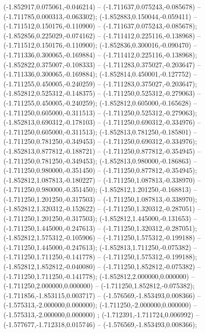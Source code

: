  (-1.852917,0.075061,-0.046214) -- (-1.711637,0.075243,-0.085678) -- (-1.711785,0.000313,-0.063302);
 (-1.852883,0.150044,-0.059411) -- (-1.711512,0.150176,-0.110900) -- (-1.711637,0.075243,-0.085678);
 (-1.852856,0.225029,-0.074162) -- (-1.711412,0.225116,-0.138968) -- (-1.711512,0.150176,-0.110900);
 (-1.852836,0.300016,-0.090470) -- (-1.711336,0.300065,-0.169884) -- (-1.711412,0.225116,-0.138968);
 (-1.852822,0.375007,-0.108333) -- (-1.711283,0.375027,-0.203647) -- (-1.711336,0.300065,-0.169884);
 (-1.852814,0.450001,-0.127752) -- (-1.711255,0.450005,-0.240259) -- (-1.711283,0.375027,-0.203647);
 (-1.852812,0.525312,-0.148375) -- (-1.711250,0.525312,-0.279063) -- (-1.711255,0.450005,-0.240259);
 (-1.852812,0.605000,-0.165628) -- (-1.711250,0.605000,-0.311513) -- (-1.711250,0.525312,-0.279063);
 (-1.852813,0.690312,-0.178103) -- (-1.711250,0.690312,-0.334976) -- (-1.711250,0.605000,-0.311513);
 (-1.852813,0.781250,-0.185801) -- (-1.711250,0.781250,-0.349453) -- (-1.711250,0.690312,-0.334976);
 (-1.852813,0.877812,-0.188721) -- (-1.711250,0.877812,-0.354945) -- (-1.711250,0.781250,-0.349453);
 (-1.852813,0.980000,-0.186863) -- (-1.711250,0.980000,-0.351450) -- (-1.711250,0.877812,-0.354945);
 (-1.852812,1.087813,-0.180227) -- (-1.711250,1.087813,-0.338970) -- (-1.711250,0.980000,-0.351450);
 (-1.852812,1.201250,-0.168813) -- (-1.711250,1.201250,-0.317503) -- (-1.711250,1.087813,-0.338970);
 (-1.852812,1.320312,-0.152622) -- (-1.711250,1.320312,-0.287051) -- (-1.711250,1.201250,-0.317503);
 (-1.852812,1.445000,-0.131653) -- (-1.711250,1.445000,-0.247613) -- (-1.711250,1.320312,-0.287051);
 (-1.852812,1.575312,-0.105906) -- (-1.711250,1.575312,-0.199188) -- (-1.711250,1.445000,-0.247613);
 (-1.852813,1.711250,-0.075382) -- (-1.711250,1.711250,-0.141778) -- (-1.711250,1.575312,-0.199188);
 (-1.852812,1.852812,-0.040080) -- (-1.711250,1.852812,-0.075382) -- (-1.711250,1.711250,-0.141778);
 (-1.852812,2.000000,0.000000) -- (-1.711250,2.000000,0.000000) -- (-1.711250,1.852812,-0.075382);
 (-1.711856,-1.853115,0.003717) -- (-1.576569,-1.853493,0.008366) -- (-1.575313,-2.000000,0.000000);
 (-1.711250,-2.000000,0.000000) -- (-1.575313,-2.000000,0.000000) ;
 (-1.712391,-1.711724,0.006992) -- (-1.577677,-1.712318,0.015746) -- (-1.576569,-1.853493,0.008366);
